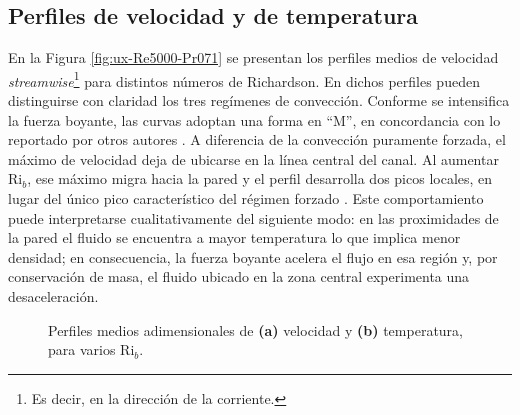 \subsection{Perfiles de velocidad y de temperatura} \label{sec:velo_temp}

En la Figura \ref{fig:ux-Re5000-Pr071} se presentan los perfiles medios de velocidad  \textit{streamwise}\footnote{Es decir, en la dirección de la corriente.} para distintos números de Richardson. En dichos perfiles pueden distinguirse con claridad los tres regímenes de convección. Conforme se intensifica la fuerza boyante, las curvas adoptan una forma en ``M'', en concordancia con lo reportado por otros autores \cite{you2003direct, zhou2024direct}. A diferencia de la convección puramente forzada, el máximo de velocidad deja de ubicarse en la línea central del canal. Al aumentar $\mathrm{Ri}_b$, ese máximo migra hacia la pared y el perfil desarrolla dos picos locales, en lugar del único pico característico del régimen forzado \cite{carr1973velocity,steiner1971reverse,zhou2024direct}. Este comportamiento puede interpretarse cualitativamente del siguiente modo: en las proximidades de la pared el fluido se encuentra a mayor temperatura lo que implica menor densidad; en consecuencia, la fuerza boyante acelera el flujo en esa región y, por conservación de masa, el fluido ubicado en la zona central experimenta una desaceleración.

\begin{figure}[H]
  \centering
  \caption{Perfiles medios adimensionales de \textbf{(a)} velocidad y \textbf{(b)} temperatura, para varios Ri$_b$.}
\end{figure}

